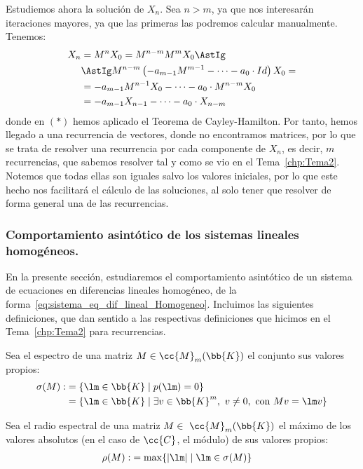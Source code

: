 Estudiemos ahora la solución de $X_n$. Sea $n>m$, ya que nos interesarán iteraciones mayores, ya que las primeras las podremos calcular manualmente. Tenemos:
\begin{align*}
    X_n &= M^nX_0 = M^{n-m}M^mX_0 \AstIg\\
    &\AstIg M^{n-m}\left(-a_{m-1}M^{m-1} - \dots - a_0\cdot Id\right)X_0 =\\
    &= -a_{m-1}M^{n-1}X_0 - \dots - a_0\cdot M^{n-m}X_0 \\
    &= -a_{m-1}X_{n-1} - \dots - a_0\cdot X_{n-m}
\end{align*}
donde en $(\ast)$ hemos aplicado el Teorema de Cayley-Hamilton.
Por tanto, hemos llegado a una recurrencia de vectores, donde no encontramos matrices, por lo que se trata de resolver una recurrencia por cada componente de $X_n$, es decir, $m$ recurrencias, que sabemos resolver tal y como se vio en el Tema~\ref{chp:Tema2}.
Notemos que todas ellas son iguales salvo los valores iniciales, por lo
que este hecho nos facilitará el cálculo de las soluciones, al solo tener que resolver de forma
general una de las recurrencias.


\subsubsection{Comportamiento asintótico de los sistemas lineales homogéneos.}
En la presente sección, estudiaremos el comportamiento asintótico de un sistema de ecuaciones en diferencias lineales homogéneo, de la forma~\ref{eq:sistema_eq_dif_lineal_Homogeneo}. Incluimos las siguientes definiciones, que dan sentido a las respectivas definiciones que hicimos en el Tema~\ref{chp:Tema2} para recurrencias.
\begin{definicion}[Espectro]
    Sea el espectro de una matriz $M\in \cc{M}_m(\bb{K})$
    el conjunto sus valores propios:
    \begin{align*}
        \sigma(M) :&= \{\lm \in \bb{K} \mid p(\lm) = 0\}\\
        &= \{\lm \in \bb{K} \mid \exists v\in \bb{K}^m,~v\neq 0, \text{ con } Mv=\lm v\}
    \end{align*}
\end{definicion}

\begin{definicion}
    Sea el radio espectral de una matriz $M\in~\cc{M}_m(\bb{K})$
    el máximo de los valores absolutos (en el caso de $\cc{C}$, el módulo) de sus valores propios:
    \begin{align*}
        \rho(M) :&= \max\{|\lm|\mid \lm\in \sigma(M)\}
    \end{align*}
\end{definicion}

